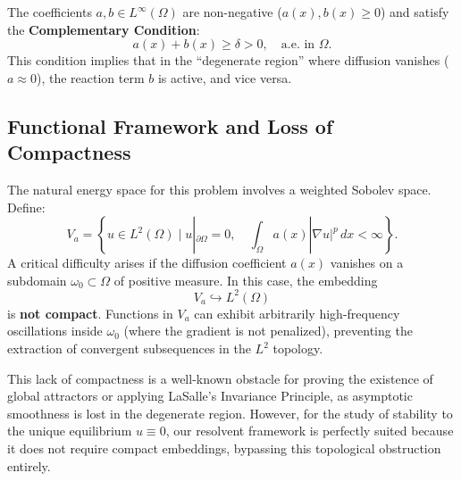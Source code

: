 \documentclass[11pt,reqno]{amsart}
\theoremstyle{remark}
\begin{document}
The coefficients $a, b \in L^\infty(\Omega)$ are non-negative ($a(x), b(x) \ge 0$) and satisfy the \textbf{Complementary Condition}:
\begin{equation} \label{cond:complementary}
    a(x) + b(x) \ge \delta > 0, \quad \text{a.e. in } \Omega.
\end{equation}
This condition implies that in the ``degenerate region'' where diffusion vanishes ($a \approx 0$), the reaction term $b$ is active, and vice versa.

\subsection{Functional Framework and Loss of Compactness}
The natural energy space for this problem involves a weighted Sobolev space. Define:
\[
    V_a = \left\{ u \in L^2(\Omega) \mid u|_{\partial \Omega}=0, \quad \int_\Omega a(x) |\nabla u|^p \, dx < \infty \right\}.
\]
A critical difficulty arises if the diffusion coefficient $a(x)$ vanishes on a subdomain $\omega_0 \subset \Omega$ of positive measure. In this case, the embedding
\[
    V_a \hookrightarrow L^2(\Omega)
\]
is \textbf{not compact}. Functions in $V_a$ can exhibit arbitrarily high-frequency oscillations inside $\omega_0$ (where the gradient is not penalized), preventing the extraction of convergent subsequences in the $L^2$ topology.

This lack of compactness is a well-known obstacle for proving the existence of global attractors or applying LaSalle's Invariance Principle, as asymptotic smoothness is lost in the degenerate region. However, for the study of stability to the unique equilibrium $u \equiv 0$, our resolvent framework is perfectly suited because it does not require compact embeddings, bypassing this topological obstruction entirely.
\end{document}

